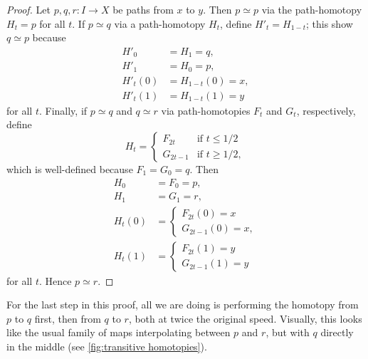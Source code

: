 \documentclass{article}
\theoremstyle{definition}
\theoremstyle{remark}
\numberwithin{figure}{section}
\begin{document}
\begin{proof}
	Let $p, q, r : I \to X$ be paths from $x$ to $y$. Then $p \simeq p$ via the path-homotopy $H_t = p$ for all $t$. If $p \simeq q$ via a path-homotopy $H_t$, define $H'_t = H_{1 - t}$; this show $q \simeq p$ because
	\begin{align*}
		H'_0 &= H_1 = q,\\
		H'_1 &= H_0 = p,\\
		H'_t(0) &= H_{1 - t}(0) = x,\\
		H'_t(1) &= H_{1 - t}(1) = y
	\end{align*}
	for all $t$. Finally, if $p \simeq q$ and $q \simeq r$ via path-homotopies $F_t$ and $G_t$, respectively, define
	\[
	H_t = \begin{cases}
		F_{2t} & \text{if } t \leq 1/2\\
		G_{2t - 1} & \text{if } t \geq 1/2,
	\end{cases}
	\]
	which is well-defined because $F_1 = G_0 = q$. Then
	\begin{align*}
		H_0 &= F_0 = p,\\
		H_1 &= G_1 = r,\\
		H_t(0) &= \begin{cases}
			F_{2t}(0) = x\\
			G_{2t - 1}(0) = x,
		\end{cases}\\
		H_t(1) &= \begin{cases}
			F_{2t}(1) = y\\
			G_{2t - 1}(1) = y
		\end{cases}
	\end{align*}
	for all $t$. Hence $p \simeq r$.
\end{proof}

For the last step in this proof, all we are doing is performing the homotopy from $p$ to $q$ first, then from $q$ to $r$, both at twice the original speed. Visually, this looks like the usual family of maps interpolating between $p$ and $r$, but with $q$ directly in the middle (see \cref{fig:transitive homotopies}).
\end{document}
